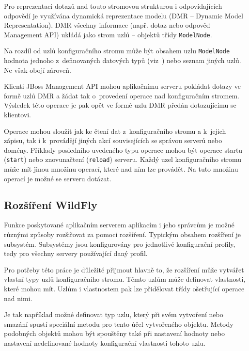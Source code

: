 Pro reprezentaci dotazů nad touto stromovou strukturou i odpovídajících odpovědí je využívána dynamická reprezentace modelu (DMR -- Dynamic Model Representation).
DMR všechny informace (např. dotaz nebo odpověď Management API) ukládá jako strom uzlů -- objektů třídy {\tt ModelNode}.
\cite{jbossDetypedManagement}

Na rozdíl od uzlů konfiguračního stromu může být obsahem uzlu {\tt ModelNode} hodnota jednoho z~definovaných datových typů (viz~\cite{jboss7slideShare}) nebo seznam jiných uzlů. Ne však obojí zároveň.
\cite{jboss7slideShare}

Klienti JBoss Management API mohou aplikačnímu serveru pokládat dotazy ve formě uzlů DMR a žádat tak o~provedení operace nad konfiguračním stromem.
Výsledek této operace je pak opět ve formě uzlu DMR předán dotazujícímu se klientovi.
\cite{jbossDetypedManagement}

Operace mohou sloužit jak ke čtení dat z~konfiguračního stromu a k~jejich zápisu, tak i k~provádějí jiných akcí souvisejících se správou serverů nebo domény.
Příklady posledního uvedeného typu operace mohou být operace startu ({\tt start}) nebo znovunačtení ({\tt reload}) serveru.
Každý uzel konfiguračního stromu může mít jinou množinu operací, které nad ním lze provádět.
Na tuto množinu operací je možné se serveru dotázat.
\cite{jbossDetypedManagement}

\subsection{Rozšíření WildFly} \label{rozsireniWildFly}

Funkce poskytované aplikačním serverem aplikacím i jeho správcům je možné různými způsoby rozšiřovat za pomoci rozšíření.
Typickým obsahem rozšíření je subsystém. Subsystémy jsou konfigurovány pro jednotlivé konfigurační profily, tedy pro všechny servery používající daný profil.

Pro potřeby této práce je důležité přijmout hlavně to, že rozšíření může vytvářet vlastní typy uzlů konfiguračního stromu.
Těmto uzlům může definovat vlastnosti, které mohou mít.
Uzlům i vlastnostem pak lze přidělovat třídy ošetřující operace nad nimi.
\cite{WildFlyExtending}

Je tak například možné definovat typ uzlu, který při svém vytvoření nebo smazání spustí speciální metodu pro tento účel vytvořeného objektu.
Metody podobných objektů mohou být spouštěny také při nastavení hodnoty nebo nastavení nedefinované hodnoty konfigurační vlastnosti tohoto uzlu.

